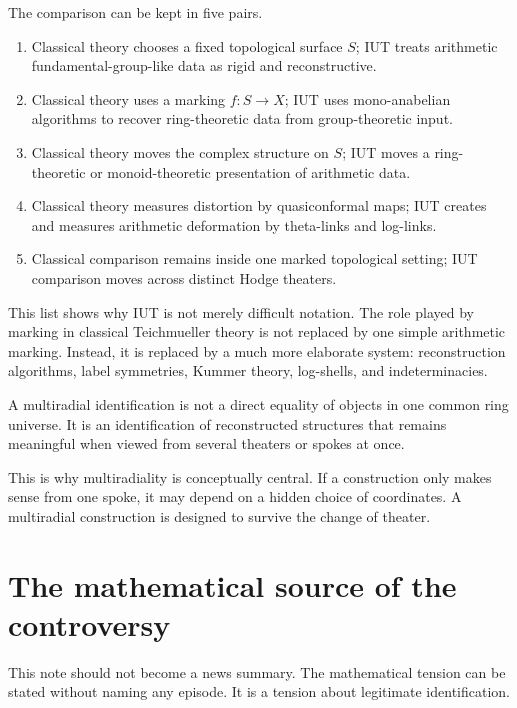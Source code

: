 The comparison can be kept in five pairs.
\begin{enumerate}
  \item Classical theory chooses a fixed topological surface \(S\); IUT treats arithmetic fundamental-group-like data as rigid and reconstructive.
  \item Classical theory uses a marking \(f:S\to X\); IUT uses mono-anabelian algorithms to recover ring-theoretic data from group-theoretic input.
  \item Classical theory moves the complex structure on \(S\); IUT moves a ring-theoretic or monoid-theoretic presentation of arithmetic data.
  \item Classical theory measures distortion by quasiconformal maps; IUT creates and measures arithmetic deformation by theta-links and log-links.
  \item Classical comparison remains inside one marked topological setting; IUT comparison moves across distinct Hodge theaters.
\end{enumerate}

This list shows why IUT is not merely difficult notation.  The role played by marking in classical Teichmueller theory is not replaced by one simple arithmetic marking.  Instead, it is replaced by a much more elaborate system: reconstruction algorithms, label symmetries, Kummer theory, log-shells, and indeterminacies.

\begin{definition}
A multiradial identification is not a direct equality of objects in one common ring universe.  It is an identification of reconstructed structures that remains meaningful when viewed from several theaters or spokes at once.
\end{definition}

This is why multiradiality is conceptually central.  If a construction only makes sense from one spoke, it may depend on a hidden choice of coordinates.  A multiradial construction is designed to survive the change of theater.

\section{The mathematical source of the controversy}

This note should not become a news summary.  The mathematical tension can be stated without naming any episode.  It is a tension about legitimate identification.

